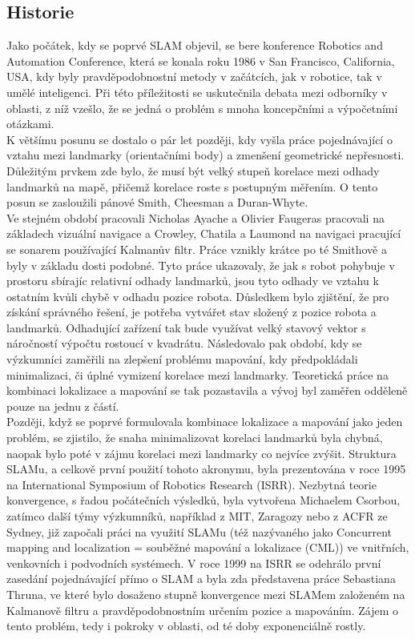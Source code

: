 \documentclass[11pt]{article}
\begin{document}
\subsection{Historie}
Jako počátek, kdy se poprvé SLAM objevil, se bere konference Robotics and Automation Conference, která se konala roku 1986 v San Francisco, California, USA, kdy byly pravděpodobnostní metody v začátcích, jak v robotice, tak v umělé inteligenci. Při této příležitosti se uskutečnila debata mezi odborníky v oblasti, z níž vzešlo, že se jedná o problém s mnoha koncepčními a výpočetními otázkami. \\
\indent K většímu posunu se dostalo o pár let později, kdy vyšla práce pojednávající o vztahu mezi landmarky (orientačními body) a zmenšení geometrické nepřesnosti. Důležitým prvkem zde bylo, že musí být velký stupeň korelace mezi odhady landmarků na mapě, přičemž korelace roste s postupným měřením. O tento posun se zasloužili pánové Smith, Cheesman a Duran-Whyte. \\
\indent Ve stejném období pracovali Nicholas Ayache a Olivier Faugeras pracovali na základech vizuální navigace a Crowley, Chatila a Laumond na navigaci pracující se sonarem používající Kalmanův filtr. Práce vznikly krátce po té Smithově a byly v základu dosti podobné. Tyto práce ukazovaly, že jak s robot pohybuje v prostoru sbírajíc relativní odhady landmarků, jsou tyto odhady ve vztahu k ostatním kvůli chybě v odhadu pozice robota. Důsledkem bylo zjištění, že pro získání správného řešení, je potřeba vytvářet stav složený z pozice robota a landmarků. Odhadující zařízení tak bude využívat velký stavový vektor s náročností výpočtu rostoucí v kvadrátu. Následovalo pak období, kdy se výzkumníci zaměřili na zlepšení problému mapování, kdy předpokládali minimalizaci, či úplné vymizení korelace mezi landmarky. Teoretická práce na kombinaci lokalizace a mapování se tak pozastavila a vývoj byl zaměřen odděleně pouze na jednu z částí.\\
\indent Později, když se poprvé formulovala kombinace lokalizace a mapování jako jeden problém, se zjistilo, že snaha minimalizovat korelaci landmarků byla chybná, naopak bylo poté v zájmu korelaci mezi landmarky co nejvíce zvýšit. Struktura SLAMu, a celkově první použití tohoto akronymu, byla prezentována v roce 1995 na International Symposium of Robotics Research (ISRR). Nezbytná teorie konvergence, s řadou počátečních výsledků, byla vytvořena Michaelem Csorbou, zatímco další týmy výzkumníků, například z MIT, Zaragozy nebo z ACFR ze Sydney, již započali práci na využití SLAMu (též nazývaného jako Concurrent mapping and localization = souběžné mapování a lokalizace (CML)) ve vnitřních, venkovních i podvodních systémech. V roce 1999 na ISRR se odehrálo první zasedání pojednávající přímo o SLAM a byla zda představena práce Sebastiana Thruna, ve které bylo dosaženo stupně konvergence mezi SLAMem založeném na Kalmanově filtru a pravděpodobnostním určením pozice a mapováním. Zájem o tento problém, tedy i pokroky v oblasti, od té doby exponenciálně rostly.\\
\end{document}
